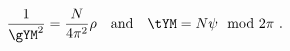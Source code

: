 \begin{equation}
\label{YMinf}
  \frac1{\gYM^2} = \frac{N}{4\pi^2} \rho \quad \text{and} \quad 
  \tYM = N\psi \mod 2\pi~.
\end{equation}

